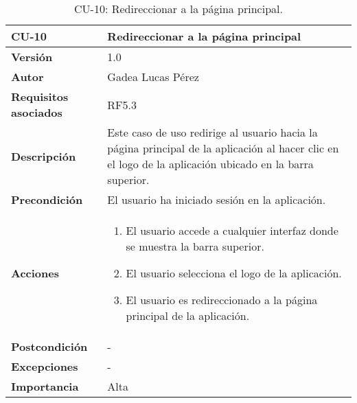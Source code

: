 \begin{table}[p]
\centering
\begin{tabularx}{\linewidth}{ p{} p{} }
\toprule
\textbf{CU-10} & \textbf{Redireccionar a la página principal}\\
\toprule
\textbf{Versión} & 1.0 \\
\textbf{Autor} & Gadea Lucas Pérez \\
\textbf{Requisitos asociados} & RF5.3 \\
\textbf{Descripción} & Este caso de uso redirige al usuario hacia la página principal de la aplicación al hacer clic en el logo de la aplicación ubicado en la barra superior.\\
\textbf{Precondición} & El usuario ha iniciado sesión en la aplicación.\\
\textbf{Acciones} &
\begin{enumerate}
\def\labelenumi{\arabic{enumi}.}
\tightlist
\item El usuario accede a cualquier interfaz donde se muestra la barra superior.
\item El usuario selecciona el logo de la aplicación.
\item El usuario es redireccionado a la página principal de la aplicación.
\end{enumerate}\\ 
\textbf{Postcondición} & - \\
\textbf{Excepciones} & - \\
\textbf{Importancia} & Alta \\
\bottomrule
\end{tabularx}
\caption{CU-10: Redireccionar a la página principal.}
\label{tab:cu10}
\end{table}


